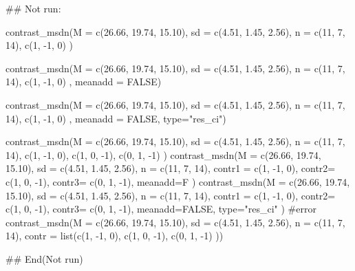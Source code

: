 \documentclass[a4paper]{book}
\begin{document}
\begin{Examples}
\begin{ExampleCode}
\#\# Not run: 


contrast_msdn(M = c(26.66, 19.74, 15.10),
              sd = c(4.51, 1.45, 2.56),
              n = c(11, 7, 14),
              c(1, -1, 0) )

contrast_msdn(M = c(26.66, 19.74, 15.10),
              sd = c(4.51, 1.45, 2.56),
              n = c(11, 7, 14),
              c(1, -1, 0) ,
              meanadd = FALSE)

contrast_msdn(M = c(26.66, 19.74, 15.10),
              sd = c(4.51, 1.45, 2.56),
              n = c(11, 7, 14),
              c(1, -1, 0) ,
             meanadd = FALSE,
              type="res_ci")


contrast_msdn(M = c(26.66, 19.74, 15.10),
              sd = c(4.51, 1.45, 2.56),
             n = c(11, 7, 14),
              c(1, -1,  0),
              c(1,  0, -1),
              c(0,  1, -1)
)
contrast_msdn(M = c(26.66, 19.74, 15.10),
              sd = c(4.51, 1.45, 2.56),
              n = c(11, 7, 14),
              contr1 = c(1, -1,  0),
              contr2= c(1,  0, -1),
              contr3= c(0,  1, -1),
              meanadd=F
)
contrast_msdn(M = c(26.66, 19.74, 15.10),
              sd = c(4.51, 1.45, 2.56),
              n = c(11, 7, 14),
             contr1 = c(1, -1,  0),
             contr2= c(1,  0, -1),
              contr3= c(0,  1, -1),
              meanadd=FALSE, type="res_ci"
)
#error
contrast_msdn(M = c(26.66, 19.74, 15.10),
              sd = c(4.51, 1.45, 2.56),
             n = c(11, 7, 14),
              contr = list(c(1, -1,  0),
                            c(1,  0, -1),
                           c(0,  1, -1)
              ))



## End(Not run)
\end{ExampleCode}
\end{Examples}
\end{document}
